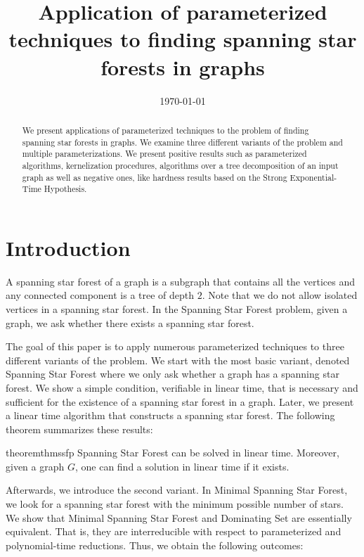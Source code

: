\documentclass[en]{pracamgr}
\title{Application of parameterized techniques to finding spanning star forests in graphs}
\date{\monthyeardate\today}
\theoremstyle{definition}
\newcommand{\ssfp}{{\sc Spanning Star Forest}}
\newcommand{\mssfp}{{\sc Minimal Spanning Star Forest}}
\newcommand{\domsetp}{{\sc Dominating Set}}
\begin{document}
\maketitle

\begin{abstract}
	We present applications of parameterized techniques to the problem of finding spanning star forests in graphs. We examine three different variants of the problem and multiple parameterizations. We present positive results such as parameterized algorithms, kernelization procedures, algorithms over a tree decomposition of an input graph as well as negative ones, like hardness results based on the Strong Exponential-Time Hypothesis.
\end{abstract}

\tableofcontents

\chapter{Introduction}

A spanning star forest of a graph is a subgraph that contains all the vertices and any connected component is a tree of depth $2$. Note that we do not allow isolated vertices in a spanning star forest. In the \ssfp{} problem, given a graph, we ask whether there exists a spanning star forest. 

The goal of this paper is to apply numerous parameterized techniques to three different variants of the problem. We start with the most basic variant, denoted \ssfp{} where we only ask whether a graph has a spanning star forest. We show a simple condition, verifiable in linear time, that is necessary and sufficient for the existence of a spanning star forest in a graph. Later, we present a linear time algorithm that constructs a spanning star forest. The following theorem summarizes these results:

\begin{restatable}{theorem}{thmssfp}\label{thm-ssfp}
	\ssfp{} can be solved in linear time. Moreover, given a graph $G$, one can find a solution in linear time if it exists.
\end{restatable}

Afterwards, we introduce the second variant. In \mssfp{}, we look for a spanning star forest with the minimum possible number of stars. We show that \mssfp{} and \domsetp{} are essentially equivalent. That is, they are interreducible with respect to parameterized and polynomial-time reductions. Thus, we obtain the following outcomes:
\end{document}

